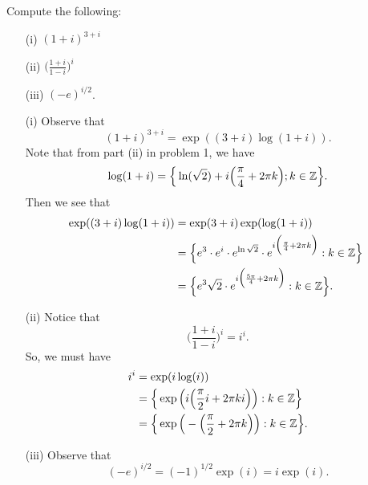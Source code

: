 \documentclass[a4paper]{article}
\begin{document}
\begin{problem}
   Compute the following: 
   \begin{enumerate}
       \item[(i)] \( (1 + i)^{3 +i} \)
        \item[(ii)] \( \Big(  \frac{ 1 + i  }{  1 - i  }  \Big)^{i} \)
        \item[(iii)] \( (-e)^{i/2} \).
   \end{enumerate}
\end{problem}
\begin{solution}
    \begin{enumerate}
        \item[(i)] Observe that 
            \[  (1+i)^{3+i} = \exp((3+i)\log(1+i)). \]
            Note that from part (ii) in problem 1, we have  
            \[  \log(1+i) = \Big\{ \ln(\sqrt{ 2 } ) + i \Big(  \frac{ \pi }{ 4 }  + 2 \pi k  \Big); k \in \mathbb{Z} \Big\}.  \]
            Then we see that
            \begin{align*}
                \exp((3+i)\log(1+i)) &= \exp(3+i) \exp(\log(1+i)) \\
                                     &= \Big\{ e^{3} \cdot e^{i} \cdot e^{\ln \sqrt{ 2 } } \cdot e^{i \Big(  \frac{ \pi  }{ 4 }  + 2 \pi k \Big)} : k \in \mathbb{Z}  \Big\} \ \\
                                     &= \Big\{ e^{3} \sqrt{ 2 } \cdot e^{i \Big(  \frac{ 5 \pi  }{ 4  }  + 2 \pi k  \Big)}: k \in \mathbb{Z} \Big\}.  
            \end{align*}
        \item[(ii)] Notice that  
            \[  \Big(  \frac{ 1 + i  }{  1 - i  }   \Big)^{i} = i^{i}.  \]
            So, we must have
            \begin{align*}
                i^{i} &= \exp(i \log(i)) \\
                      &= \Big\{ \exp \Big(  i \Big(  \frac{ \pi }{ 2 }  i + 2 \pi k i  \Big) \Big) : k \in \mathbb{Z}  \Big\} \\
                      &= \Big\{ \exp \Big(  - \Big(  \frac{ \pi }{ 2 }  + 2 \pi k  \Big) \Big): k \in \mathbb{Z} \Big\}.  
            \end{align*}
        \item[(iii)] Observe that 
            \[  (-e)^{i/2} = (-1)^{1/2} \exp(i) = i \exp(i).  \]
    \end{enumerate}
\end{solution}
\end{document}
